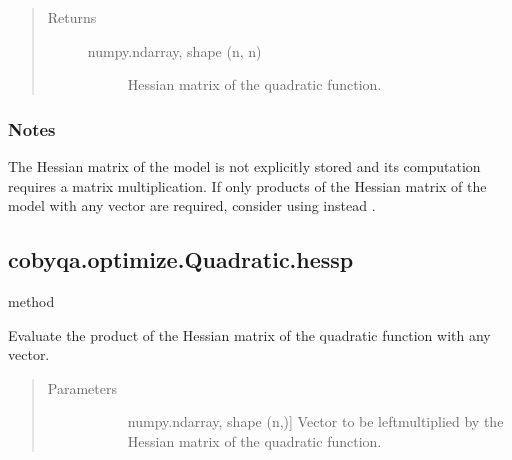 \documentclass[letterpaper,10pt,english]{sphinxmanual}
\begin{document}
\begin{fulllineitems}
\begin{fulllineitems}
\begin{quote}
\begin{description}
\begin{description}
\end{description}

\item[{Returns}] \leavevmode\begin{description}
\item[{numpy.ndarray, shape (n, n)}] \leavevmode
\sphinxAtStartPar
Hessian matrix of the quadratic function.

\end{description}

\end{description}\end{quote}
\subsubsection*{Notes}

\sphinxAtStartPar
The Hessian matrix of the model is not explicitly stored and its
computation requires a matrix multiplication. If only products of the
Hessian matrix of the model with any vector are required, consider using
instead {\hyperref[\detokenize{refs/generated/cobyqa.optimize.Quadratic.hessp:cobyqa.optimize.Quadratic.hessp}]{}}.

\end{fulllineitems}



\subsection{cobyqa.optimize.Quadratic.hessp}
\label{\detokenize{refs/generated/cobyqa.optimize.Quadratic.hessp:cobyqa-optimize-quadratic-hessp}}\label{\detokenize{refs/generated/cobyqa.optimize.Quadratic.hessp::doc}}
\sphinxAtStartPar
method

\begin{fulllineitems}
\label{\detokenize{refs/generated/cobyqa.optimize.Quadratic.hessp:cobyqa.optimize.Quadratic.hessp}}
\sphinxAtStartPar
Evaluate the product of the Hessian matrix of the quadratic function
with any vector.
\begin{quote}\begin{description}
\item[{Parameters}] \leavevmode\begin{description}
\item[{}] \leavevmode{[}numpy.ndarray, shape (n,){]}
\sphinxAtStartPar
Vector to be left\sphinxhyphen{}multiplied by the Hessian matrix of the quadratic
function.


\end{description}
\end{description}
\end{quote}
\end{fulllineitems}
\end{fulllineitems}
\end{document}
